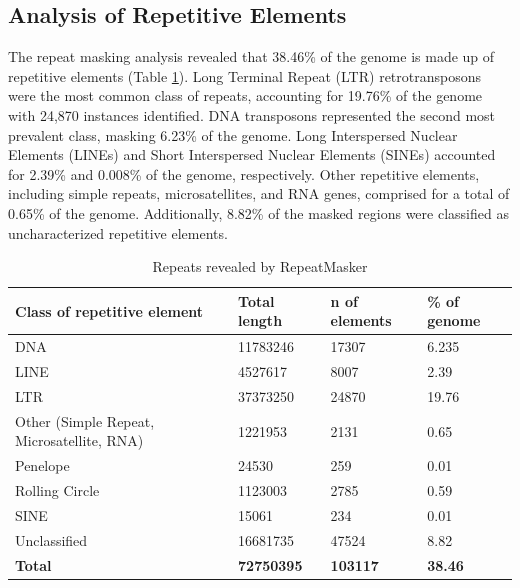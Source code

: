 \documentclass[9pt,twocolumn,twoside,lineno]{gsag3jnl}
\begin{document}
\subsection{Analysis of Repetitive Elements}

The repeat masking analysis revealed that 38.46\% of the genome is made up of repetitive elements (Table \ref{tab:repeats_annotation}). Long Terminal Repeat (LTR) retrotransposons were the most common class of repeats, accounting for 19.76\% of the genome with 24,870 instances identified. DNA transposons represented the second most prevalent class, masking 6.23\% of the genome. Long Interspersed Nuclear Elements (LINEs) and Short Interspersed Nuclear Elements (SINEs) accounted for 2.39\% and 0.008\% of the genome, respectively. Other repetitive elements, including simple repeats, microsatellites, and RNA genes, comprised for a total of 0.65\% of the genome. Additionally, 8.82\% of the masked regions were classified as uncharacterized repetitive elements.

\begin{table}[p]
\centering
\caption{Repeats revealed by RepeatMasker}
\begin{tableminipage}{\textwidth}
\begin{tabularx}{\textwidth}{@{}XXXX@{}}
\hline
\textbf{Class of repetitive element}       & \textbf{Total length} & \textbf{n of elements} & \textbf{\% of genome} \\
\hline
DNA                                        & 11783246              & 17307                  & 6.235                 \\
LINE                                       & 4527617               & 8007                   & 2.39                  \\
LTR                                        & 37373250              & 24870                  & 19.76                 \\
Other (Simple Repeat, Microsatellite, RNA) & 1221953               & 2131                   & 0.65                  \\
Penelope                                   & 24530                 & 259                    & 0.01                  \\
Rolling Circle                             & 1123003               & 2785                   & 0.59                  \\
SINE                                       & 15061                 & 234                    & 0.01                  \\
Unclassified                               & 16681735              & 47524                  & 8.82                  \\
\textbf{Total}                             & \textbf{72750395}     & \textbf{103117}        & \textbf{38.46}       \\
\hline
\end{tabularx}
  \label{tab:repeats_annotation}
\end{tableminipage}
\end{table}
\end{document}
